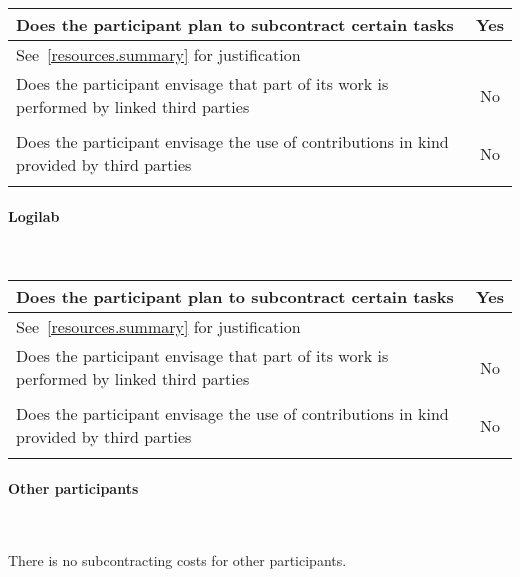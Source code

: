 \documentclass[noworkareas,deliverables,\classoptions]{euproposal}       %
\begin{document}
\begin{proposal}
\bgroup
\def\arraystretch{1.5}  %
\noindent \begin{tabular}{|p{}|c|}
\hline
Does the participant plan to subcontract certain
tasks & Yes \\
\hline
\multicolumn{2}{|l|}{See~\ref{resources.summary} for justification} \\
\hline
Does the participant envisage that part of its work
is performed by linked third parties & No \\
\hline
\multicolumn{2}{|l|}{} \\
\hline
Does the participant envisage the use of
contributions in kind provided by
third parties & No \\
\hline
\multicolumn{2}{|l|}{} \\
\hline
\end{tabular}
\egroup

\paragraph{Logilab}\ 

\bgroup
\def\arraystretch{1.5}  %
\noindent \begin{tabular}{|p{}|c|}
\hline
Does the participant plan to subcontract certain
tasks & Yes \\
\hline
\multicolumn{2}{|l|}{See~\ref{resources.summary} for justification} \\
\hline
Does the participant envisage that part of its work
is performed by linked third parties & No \\
\hline
\multicolumn{2}{|l|}{} \\
\hline
Does the participant envisage the use of
contributions in kind provided by
third parties & No \\
\hline
\multicolumn{2}{|l|}{} \\
\hline
\end{tabular}
\egroup

\paragraph{Other participants}\ 

There is no subcontracting costs for other participants.





\end{proposal}
\end{document}
